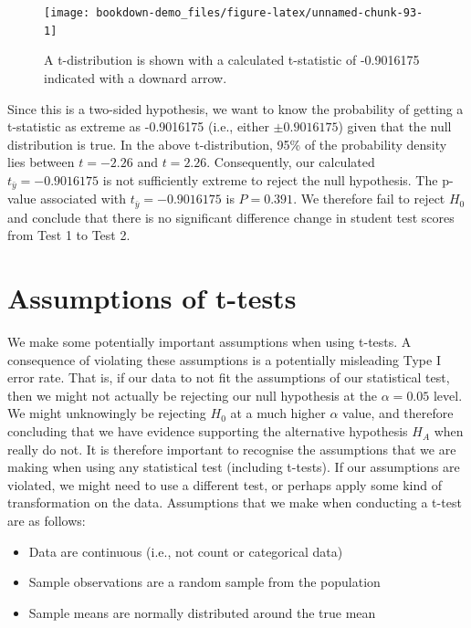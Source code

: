 \documentclass[
]{scrbook}
\providecommand{\tightlist}{%
  \setlength{\itemsep}{0pt}\setlength{\parskip}{0pt}}
\begin{document}
\begin{figure}
\texttt{[image: bookdown-demo\_files/figure-latex/unnamed-chunk-93-1]} \caption{A t-distribution is shown with a calculated t-statistic of -0.9016175 indicated with a downard arrow.}\label{fig:unnamed-chunk-93}
\end{figure}

Since this is a two-sided hypothesis, we want to know the probability of getting a t-statistic as extreme as -0.9016175 (i.e., either \(\pm 0.9016175\)) given that the null distribution is true.
In the above t-distribution, 95\% of the probability density lies between \(t = -2.26\) and \(t = 2.26\).
Consequently, our calculated \(t_{\bar{y}} = -0.9016175\) is not sufficiently extreme to reject the null hypothesis.
The p-value associated with \(t_{\bar{y}} = -0.9016175\) is \(P = 0.391\).
We therefore fail to reject \(H_{0}\) and conclude that there is no significant difference change in student test scores from Test 1 to Test 2.

\hypertarget{assumptions-of-t-tests}{%
\section{Assumptions of t-tests}\label{assumptions-of-t-tests}}

We make some potentially important assumptions when using t-tests.
A consequence of violating these assumptions is a potentially misleading Type I error rate.
That is, if our data to not fit the assumptions of our statistical test, then we might not actually be rejecting our null hypothesis at the \(\alpha = 0.05\) level.
We might unknowingly be rejecting \(H_{0}\) at a much higher \(\alpha\) value, and therefore concluding that we have evidence supporting the alternative hypothesis \(H_{A}\) when really do not.
It is therefore important to recognise the assumptions that we are making when using any statistical test (including t-tests).
If our assumptions are violated, we might need to use a different test, or perhaps apply some kind of transformation on the data.
Assumptions that we make when conducting a t-test are as follows:

\begin{itemize}
\tightlist
\item
  Data are continuous (i.e., not count or categorical data)
\item
  Sample observations are a random sample from the population
\item
  Sample means are normally distributed around the true mean
\end{itemize}
\end{document}
